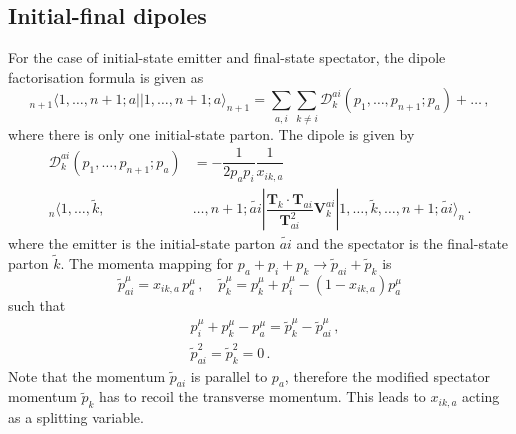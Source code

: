 \documentclass[main.tex]{subfiles}
\begin{document}
    \subsection{Initial-final dipoles}
        For the case of initial-state emitter and final-state spectator,
        the dipole factorisation formula is given as
        \begin{equation}\label{eqn:IF_factorisation}
            {}_{n+1} \langle 1, \ldots, n+1; a || 1, \ldots, n+1; a \rangle_{n+1} = \sum_{a,i}\sum_{k \neq i}\mathcal{D}_{k}^{ai}(p_{1},\ldots,p_{n+1};p_{a}) + \ldots \, ,
        \end{equation}
        where there is only one initial-state parton. The dipole is given by
        \begin{equation}\label{eqn:D_aik}
            \begin{split}
            \mathcal{D}_{k}^{ai}(p_{1}, \ldots, p_{n+1};p_{a}) &= -\dfrac{1}{2p_{a}p_{i}}\dfrac{1}{x_{ik,a}} \\
            {}_{n}\langle 1, \ldots, \tilde{k}, &\ldots, n+1 ; \widetilde{ai} | \dfrac{\boldsymbol{T}_{k} \cdot \boldsymbol{T}_{ai}}{\boldsymbol{T}_{ai}^{2}} \boldsymbol{V}_{k}^{ai} | 1, \ldots, \tilde{k}, \ldots, n+1; \widetilde{ai} \rangle_{n} \, .
            \end{split}
        \end{equation}
        where the emitter is the initial-state parton $\widetilde{ai}$
        and the spectator is the final-state parton $\tilde{k}$.
        The momenta mapping for $p_{a} + p_{i} + p_{k} \rightarrow \tilde{p}_{ai} + \tilde{p}_{k}$ is
        \begin{equation}\label{eqn:IF_mapping}
            \tilde{p}_{ai}^{\mu} = x_{ik,a} \, p_{a}^{\mu} \, , \quad \tilde{p}_{k}^{\mu} = p_{k}^{\mu} + p_{i}^{\mu} - (1-x_{ik,a})p_{a}^{\mu} 
        \end{equation}
        such that
        \begin{equation}\label{eqn:IF_mapping_conditions}
            \begin{split}
            &p_{i}^{\mu} + p_{k}^{\mu} - p_{a}^{\mu} = \tilde{p}_{k}^{\mu} - \tilde{p}_{ai}^{\mu} \, , \\
            &\tilde{p}_{ai}^{2} = \tilde{p}_{k}^{2} = 0 \, .
            \end{split}
        \end{equation}
        Note that the momentum $\tilde{p}_{ai}$ is parallel
        to $p_{a}$, therefore the modified spectator momentum $\tilde{p}_{k}$
        has to recoil the transverse momentum. This leads to $x_{ik,a}$
        acting as a splitting variable.
\end{document}
